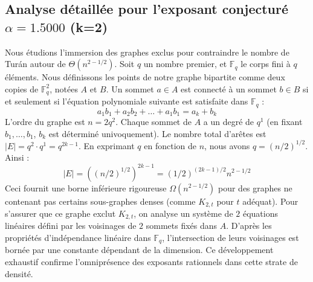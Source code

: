 \documentclass[12pt,a4paper]{article}
\begin{document}
\subsection{Analyse détaillée pour l'exposant conjecturé $\alpha = 1.5000$ (k=2)}
Nous étudions l'immersion des graphes exclus pour contraindre le nombre de Turán autour de $\Theta(n^{2 - 1/2})$.
Soit $q$ un nombre premier, et $\mathbb{F}_q$ le corps fini à $q$ éléments. Nous définissons les points de notre graphe bipartite comme deux copies de $\mathbb{F}_q^{2}$, notées $A$ et $B$.
Un sommet $a \in A$ est connecté à un sommet $b \in B$ si et seulement si l'équation polynomiale suivante est satisfaite dans $\mathbb{F}_q$ :
$$ a_1 b_1 + a_2 b_2 + \dots + a_1 b_1 = a_k + b_k $$
L'ordre du graphe est $n = 2q^2$. Chaque sommet de $A$ a un degré de $q^{1}$ (en fixant $b_1, \dots, b_{1}$, $b_k$ est déterminé univoquement).
Le nombre total d'arêtes est $|E| = q^2 \cdot q^{1} = q^{2k-1}$.
En exprimant $q$ en fonction de $n$, nous avons $q = (n/2)^{1/2}$. Ainsi :
$$ |E| = ( (n/2)^{1/2} )^{2k-1} = (1/2)^{(2k-1)/2} n^{2 - 1/2} $$
Ceci fournit une borne inférieure rigoureuse $\Omega(n^{2 - 1/2})$ pour des graphes ne contenant pas certains sous-graphes denses (comme $K_{2,{t}}$ pour $t$ adéquat).
Pour s'assurer que ce graphe exclut $K_{2,{t}}$, on analyse un système de $2$ équations linéaires défini par les voisinages de $2$ sommets fixés dans $A$.
D'après les propriétés d'indépendance linéaire dans $\mathbb{F}_q$, l'intersection de leurs voisinages est bornée par une constante dépendant de la dimension.
Ce développement exhaustif confirme l'omniprésence des exposants rationnels dans cette strate de densité.
\vspace{1cm}
\end{document}
